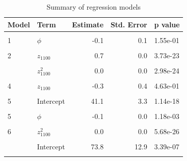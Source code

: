 \documentclass[draft,linenumbers]{agujournal2018}
\begin{document}
\begin{table}

\caption{\label{tab:reg.summary}Summary of regression models}
\centering
\fontsize{8}{10}\selectfont
\begin{threeparttable}
\begin{tabular}[t]{llrrl}
\toprule
Model & Term & Estimate & Std. Error & p value\\
\midrule
\cellcolor{gray!6}{1} & \cellcolor{gray!6}{Intercept} & \cellcolor{gray!6}{89.4} & \cellcolor{gray!6}{3.7} & \cellcolor{gray!6}{2.24e-33}\\
1 & $\phi$ & -0.1 & 0.1 & 1.55e-01\\
\cellcolor{gray!6}{2} & \cellcolor{gray!6}{Intercept} & \cellcolor{gray!6}{36.4} & \cellcolor{gray!6}{3.2} & \cellcolor{gray!6}{7.15e-17}\\
2 & $z_{1100}$ & 0.7 & 0.0 & 3.73e-23\\
\cellcolor{gray!6}{3} & \cellcolor{gray!6}{Intercept} & \cellcolor{gray!6}{58.9} & \cellcolor{gray!6}{1.7} & \cellcolor{gray!6}{1.43e-41}\\
\addlinespace
3 & $z_{1100}^2$ & 0.0 & 0.0 & 2.98e-24\\
\cellcolor{gray!6}{4} & \cellcolor{gray!6}{Intercept} & \cellcolor{gray!6}{69.2} & \cellcolor{gray!6}{14.0} & \cellcolor{gray!6}{6.25e-06}\\
4 & $z_{1100}$ & -0.3 & 0.4 & 4.63e-01\\
\cellcolor{gray!6}{4} & \cellcolor{gray!6}{$z_{1100}^2$} & \cellcolor{gray!6}{0.0} & \cellcolor{gray!6}{0.0} & \cellcolor{gray!6}{1.95e-02}\\
5 & Intercept & 41.1 & 3.3 & 1.14e-18\\
\addlinespace
\cellcolor{gray!6}{5} & \cellcolor{gray!6}{$z_{1100}$} & \cellcolor{gray!6}{0.7} & \cellcolor{gray!6}{0.0} & \cellcolor{gray!6}{1.12e-24}\\
5 & $\phi$ & -0.1 & 0.0 & 1.18e-03\\
\cellcolor{gray!6}{6} & \cellcolor{gray!6}{Intercept} & \cellcolor{gray!6}{63.6} & \cellcolor{gray!6}{2.1} & \cellcolor{gray!6}{8.29e-39}\\
6 & $z_{1100}^2$ & 0.0 & 0.0 & 5.68e-26\\
\cellcolor{gray!6}{6} & \cellcolor{gray!6}{$\phi$} & \cellcolor{gray!6}{-0.1} & \cellcolor{gray!6}{0.0} & \cellcolor{gray!6}{6.98e-04}\\
\addlinespace
7 & Intercept & 73.8 & 12.9 & 3.39e-07\\
\cellcolor{gray!6}{7} & \cellcolor{gray!6}{$z_{1100}$} & \cellcolor{gray!6}{-0.3} & \cellcolor{gray!6}{0.4} & \cellcolor{gray!6}{4.23e-01}\\

\end{tabular}
\end{threeparttable}
\end{table}
\end{document}
